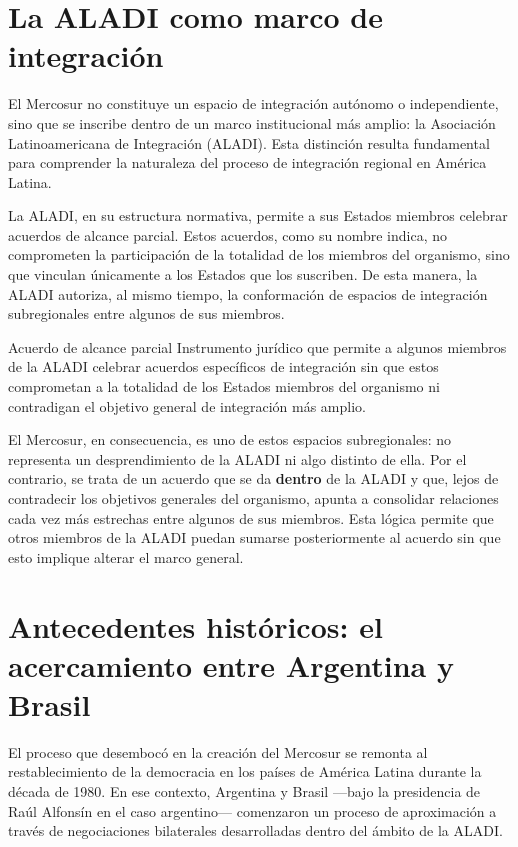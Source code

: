 \documentclass[12pt,oneside]{book}
\begin{document}
\section{La ALADI como marco de integración}

El Mercosur no constituye un espacio de integración autónomo o independiente, sino que se inscribe dentro de un marco institucional más amplio: la Asociación Latinoamericana de Integración (ALADI). Esta distinción resulta fundamental para comprender la naturaleza del proceso de integración regional en América Latina.

La ALADI, en su estructura normativa, permite a sus Estados miembros celebrar acuerdos de alcance parcial. Estos acuerdos, como su nombre indica, no comprometen la participación de la totalidad de los miembros del organismo, sino que vinculan únicamente a los Estados que los suscriben. De esta manera, la ALADI autoriza, al mismo tiempo, la conformación de espacios de integración subregionales entre algunos de sus miembros.

\begin{definition}{Acuerdo de alcance parcial}
Instrumento jurídico que permite a algunos miembros de la ALADI celebrar acuerdos específicos de integración sin que estos comprometan a la totalidad de los Estados miembros del organismo ni contradigan el objetivo general de integración más amplio.
\end{definition}

El Mercosur, en consecuencia, es uno de estos espacios subregionales: no representa un desprendimiento de la ALADI ni algo distinto de ella. Por el contrario, se trata de un acuerdo que se da \textbf{dentro} de la ALADI y que, lejos de contradecir los objetivos generales del organismo, apunta a consolidar relaciones cada vez más estrechas entre algunos de sus miembros. Esta lógica permite que otros miembros de la ALADI puedan sumarse posteriormente al acuerdo sin que esto implique alterar el marco general.

\section{Antecedentes históricos: el acercamiento entre Argentina y Brasil}

El proceso que desembocó en la creación del Mercosur se remonta al restablecimiento de la democracia en los países de América Latina durante la década de 1980. En ese contexto, Argentina y Brasil —bajo la presidencia de Raúl Alfonsín en el caso argentino— comenzaron un proceso de aproximación a través de negociaciones bilaterales desarrolladas dentro del ámbito de la ALADI.
\end{document}
